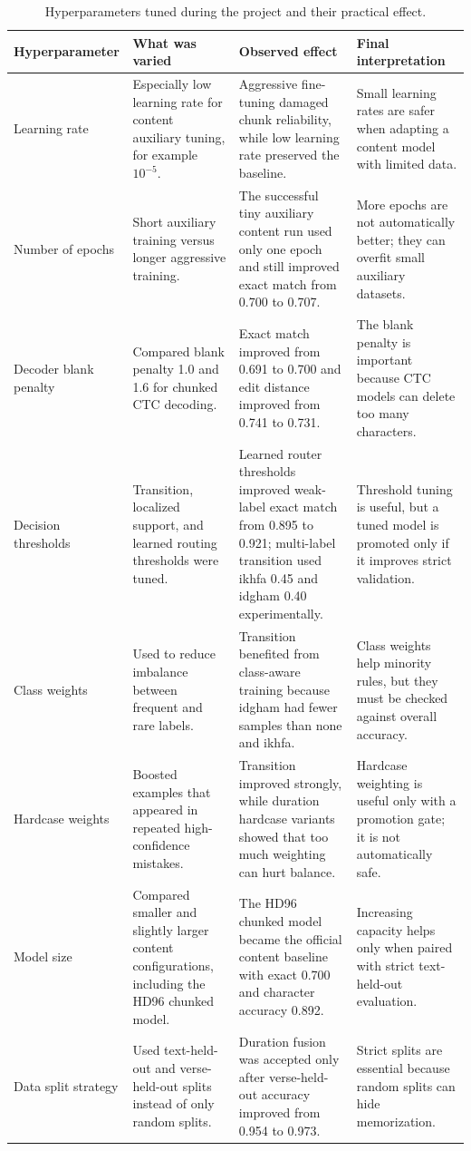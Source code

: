 \begin{table}[H]
\centering
\small
\begin{tabularx}{\textwidth}{p{} p{} p{} X}
\toprule
\textbf{Hyperparameter} & \textbf{What was varied} & \textbf{Observed effect} & \textbf{Final interpretation} \\
\midrule
Learning rate &
Especially low learning rate for content auxiliary tuning, for example
$10^{-5}$. &
Aggressive fine-tuning damaged chunk reliability, while low learning rate
preserved the baseline. &
Small learning rates are safer when adapting a content model with limited data. \\
\midrule
Number of epochs &
Short auxiliary training versus longer aggressive training. &
The successful tiny auxiliary content run used only one epoch and still improved
exact match from 0.700 to 0.707. &
More epochs are not automatically better; they can overfit small auxiliary
datasets. \\
\midrule
Decoder blank penalty &
Compared blank penalty 1.0 and 1.6 for chunked CTC decoding. &
Exact match improved from 0.691 to 0.700 and edit distance improved from 0.741
to 0.731. &
The blank penalty is important because CTC models can delete too many
characters. \\
\midrule
Decision thresholds &
Transition, localized support, and learned routing thresholds were tuned. &
Learned router thresholds improved weak-label exact match from 0.895 to 0.921;
multi-label transition used ikhfa 0.45 and idgham 0.40 experimentally. &
Threshold tuning is useful, but a tuned model is promoted only if it improves
strict validation. \\
\midrule
Class weights &
Used to reduce imbalance between frequent and rare labels. &
Transition benefited from class-aware training because idgham had fewer samples
than none and ikhfa. &
Class weights help minority rules, but they must be checked against overall
accuracy. \\
\midrule
Hardcase weights &
Boosted examples that appeared in repeated high-confidence mistakes. &
Transition improved strongly, while duration hardcase variants showed that too
much weighting can hurt balance. &
Hardcase weighting is useful only with a promotion gate; it is not automatically
safe. \\
\midrule
Model size &
Compared smaller and slightly larger content configurations, including the HD96
chunked model. &
The HD96 chunked model became the official content baseline with exact 0.700
and character accuracy 0.892. &
Increasing capacity helps only when paired with strict text-held-out evaluation. \\
\midrule
Data split strategy &
Used text-held-out and verse-held-out splits instead of only random splits. &
Duration fusion was accepted only after verse-held-out accuracy improved from
0.954 to 0.973. &
Strict splits are essential because random splits can hide memorization. \\
\bottomrule
\end{tabularx}
\caption{Hyperparameters tuned during the project and their practical effect.}
\label{tab:hyperparameter_summary}
\end{table}

